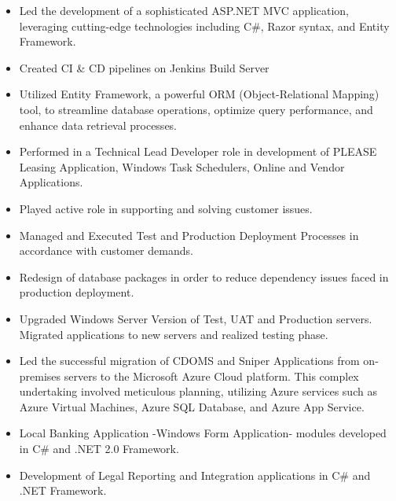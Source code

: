 \documentclass[1pt,a4paper,verdana]{moderncv} %
\begin{document}
	{\begin{itemize}
			\item Led the development of a sophisticated ASP.NET MVC application, leveraging cutting-edge technologies including C\#, Razor syntax, and Entity Framework.  
			\item Created CI \& CD pipelines on  Jenkins Build Server
			\item Utilized Entity Framework, a powerful ORM (Object-Relational Mapping) tool, to streamline database operations, optimize query performance, and enhance data retrieval processes.
\end{itemize}}
	{
		\begin{itemize}
		\item Performed in a Technical Lead Developer role in development of PLEASE Leasing Application, Windows Task Schedulers, Online and Vendor Applications.
		\item Played active role in supporting and solving customer issues.
		\item Managed and Executed Test and Production Deployment Processes in accordance with customer demands.
		\item Redesign of database packages in order to reduce dependency issues faced in production deployment.		
		\item Upgraded Windows Server Version of Test, UAT and Production servers. Migrated applications to new servers and realized testing phase.
		\item Led the successful migration of CDOMS and Sniper Applications from on-premises servers to the Microsoft Azure Cloud platform. This complex undertaking involved meticulous planning, utilizing Azure services such as Azure Virtual Machines, Azure SQL Database, and Azure App Service.
\end{itemize}}		
	{
		\begin{itemize}
		\item Local Banking Application -Windows Form Application- modules developed in C\# and .NET 2.0 Framework. 
		\item Development of Legal Reporting and Integration applications in C\# and .NET Framework.
\end{itemize}}
\end{document}
